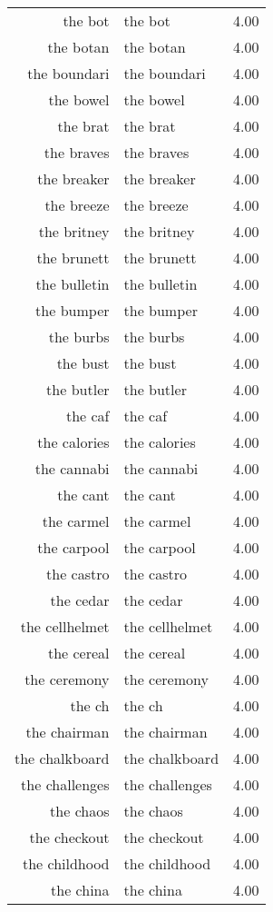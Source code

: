 \begin{table}[ht]
\begin{tabular}{rlr}
  the bot & the bot & 4.00 \\ 
  the botan & the botan & 4.00 \\ 
  the boundari & the boundari & 4.00 \\ 
  the bowel & the bowel & 4.00 \\ 
  the brat & the brat & 4.00 \\ 
  the braves & the braves & 4.00 \\ 
  the breaker & the breaker & 4.00 \\ 
  the breeze & the breeze & 4.00 \\ 
  the britney & the britney & 4.00 \\ 
  the brunett & the brunett & 4.00 \\ 
  the bulletin & the bulletin & 4.00 \\ 
  the bumper & the bumper & 4.00 \\ 
  the burbs & the burbs & 4.00 \\ 
  the bust & the bust & 4.00 \\ 
  the butler & the butler & 4.00 \\ 
  the caf & the caf & 4.00 \\ 
  the calories & the calories & 4.00 \\ 
  the cannabi & the cannabi & 4.00 \\ 
  the cant & the cant & 4.00 \\ 
  the carmel & the carmel & 4.00 \\ 
  the carpool & the carpool & 4.00 \\ 
  the castro & the castro & 4.00 \\ 
  the cedar & the cedar & 4.00 \\ 
  the cellhelmet & the cellhelmet & 4.00 \\ 
  the cereal & the cereal & 4.00 \\ 
  the ceremony & the ceremony & 4.00 \\ 
  the ch & the ch & 4.00 \\ 
  the chairman & the chairman & 4.00 \\ 
  the chalkboard & the chalkboard & 4.00 \\ 
  the challenges & the challenges & 4.00 \\ 
  the chaos & the chaos & 4.00 \\ 
  the checkout & the checkout & 4.00 \\ 
  the childhood & the childhood & 4.00 \\ 
  the china & the china & 4.00 \\ 

\end{tabular}
\end{table}

